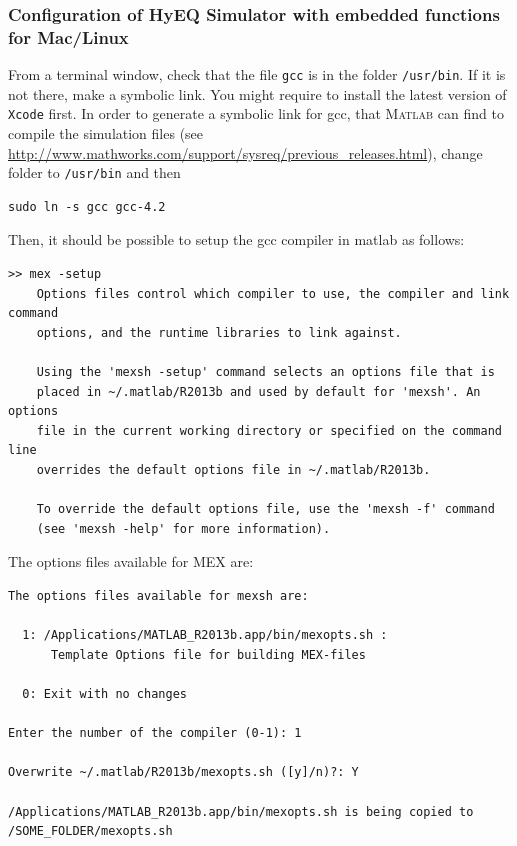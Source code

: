 \documentclass{article}
\newcommand{\matlab}{\textsc{Matlab}}
\begin{document}
\subsubsection{Configuration of HyEQ Simulator with embedded functions for Mac/Linux}

From a terminal window, check that the file {\tt gcc} is in
the folder {\tt/usr/bin}.
If it is not there, make a symbolic link. 
You might require to install the latest version of {\tt Xcode} first.
In order to generate a symbolic link for gcc, 
that \matlab{} can find to compile the simulation files 
(see \url{http://www.mathworks.com/support/sysreq/previous_releases.html}), 
change folder to {\tt /usr/bin} and then
\begin{verbatim}
sudo ln -s gcc gcc-4.2
\end{verbatim}
\noindent Then, it should be possible to setup the gcc compiler in matlab as follows:

\begin{verbatim}
>> mex -setup
    Options files control which compiler to use, the compiler and link command
    options, and the runtime libraries to link against.

    Using the 'mexsh -setup' command selects an options file that is
    placed in ~/.matlab/R2013b and used by default for 'mexsh'. An options 
    file in the current working directory or specified on the command line 
    overrides the default options file in ~/.matlab/R2013b.
 
    To override the default options file, use the 'mexsh -f' command
    (see 'mexsh -help' for more information).

\end{verbatim}

The options files available for MEX are:

\begin{verbatim}
The options files available for mexsh are:

  1: /Applications/MATLAB_R2013b.app/bin/mexopts.sh : 
      Template Options file for building MEX-files
 
  0: Exit with no changes

Enter the number of the compiler (0-1): 1

Overwrite ~/.matlab/R2013b/mexopts.sh ([y]/n)?: Y

/Applications/MATLAB_R2013b.app/bin/mexopts.sh is being copied to 
/SOME_FOLDER/mexopts.sh

\end{verbatim}
\end{document}

